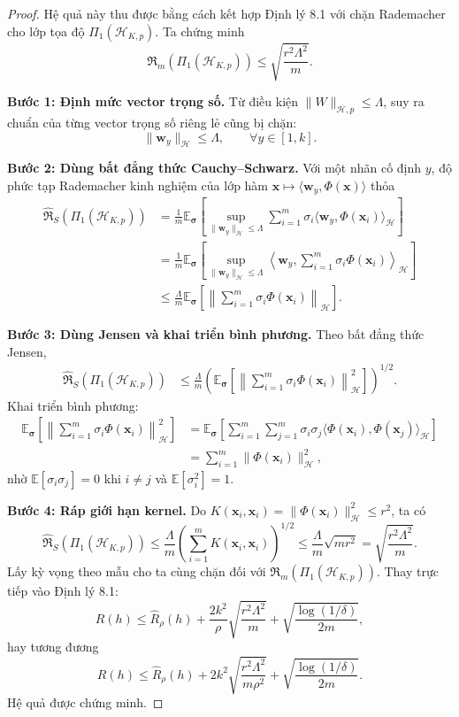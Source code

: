 \begin{proof}
Hệ quả này thu được bằng cách kết hợp Định lý 8.1 với chặn Rademacher cho lớp tọa độ $\Pi_1(\mathcal{H}_{K,p})$. Ta chứng minh
\[
  \mathfrak{R}_m(\Pi_1(\mathcal{H}_{K,p}))
  \leq \sqrt{\frac{r^2\Lambda^2}{m}}.
\]

\textbf{Bước 1: Định mức vector trọng số.}
Từ điều kiện $\|W\|_{\mathcal{H},p}\leq\Lambda$, suy ra chuẩn của từng vector trọng số riêng lẻ cũng bị chặn:
\[
  \|\bm{w}_y\|_{\mathcal{H}}\leq \Lambda,
  \qquad \forall y\in[1,k].
\]

\textbf{Bước 2: Dùng bất đẳng thức Cauchy--Schwarz.}
Với một nhãn cố định $y$, độ phức tạp Rademacher kinh nghiệm của lớp hàm $\bm{x}\mapsto\langle\bm{w}_y,\Phi(\bm{x})\rangle$ thỏa
\begin{align*}
  \widehat{\mathfrak{R}}_S(\Pi_1(\mathcal{H}_{K,p}))
  &=\frac{1}{m}\mathbb{E}_{\bm{\sigma}}
  \left[\sup_{\|\bm{w}_y\|_{\mathcal{H}}\leq\Lambda}
  \sum_{i=1}^{m}\sigma_i\langle\bm{w}_y,\Phi(\bm{x}_i)\rangle_{\mathcal{H}}\right]\\
  &=\frac{1}{m}\mathbb{E}_{\bm{\sigma}}
  \left[\sup_{\|\bm{w}_y\|_{\mathcal{H}}\leq\Lambda}
  \left\langle\bm{w}_y,\sum_{i=1}^{m}\sigma_i\Phi(\bm{x}_i)\right\rangle_{\mathcal{H}}\right]\\
  &\leq \frac{\Lambda}{m}\mathbb{E}_{\bm{\sigma}}
  \left[\left\|\sum_{i=1}^{m}\sigma_i\Phi(\bm{x}_i)\right\|_{\mathcal{H}}\right].
\end{align*}

\textbf{Bước 3: Dùng Jensen và khai triển bình phương.}
Theo bất đẳng thức Jensen,
\begin{align*}
  \widehat{\mathfrak{R}}_S(\Pi_1(\mathcal{H}_{K,p}))
  &\leq \frac{\Lambda}{m}
  \left(\mathbb{E}_{\bm{\sigma}}
  \left[\left\|\sum_{i=1}^{m}\sigma_i\Phi(\bm{x}_i)\right\|_{\mathcal{H}}^2\right]\right)^{1/2}.
\end{align*}
Khai triển bình phương:
\begin{align*}
  \mathbb{E}_{\bm{\sigma}}
  \left[\left\|\sum_{i=1}^{m}\sigma_i\Phi(\bm{x}_i)\right\|_{\mathcal{H}}^2\right]
  &=\mathbb{E}_{\bm{\sigma}}
  \left[\sum_{i=1}^{m}\sum_{j=1}^{m}\sigma_i\sigma_j
  \langle\Phi(\bm{x}_i),\Phi(\bm{x}_j)\rangle_{\mathcal{H}}\right]\\
  &=\sum_{i=1}^{m}\|\Phi(\bm{x}_i)\|_{\mathcal{H}}^2,
\end{align*}
nhờ $\mathbb{E}[\sigma_i\sigma_j]=0$ khi $i\neq j$ và $\mathbb{E}[\sigma_i^2]=1$.

\textbf{Bước 4: Ráp giới hạn kernel.}
Do $K(\bm{x}_i,\bm{x}_i)=\|\Phi(\bm{x}_i)\|_{\mathcal{H}}^2\leq r^2$, ta có
\[
  \widehat{\mathfrak{R}}_S(\Pi_1(\mathcal{H}_{K,p}))
  \leq \frac{\Lambda}{m}\left(\sum_{i=1}^{m}K(\bm{x}_i,\bm{x}_i)\right)^{1/2}
  \leq \frac{\Lambda}{m}\sqrt{mr^2}
  =\sqrt{\frac{r^2\Lambda^2}{m}}.
\]
Lấy kỳ vọng theo mẫu cho ta cùng chặn đối với $\mathfrak{R}_m(\Pi_1(\mathcal{H}_{K,p}))$. Thay trực tiếp vào Định lý 8.1:
\[
  R(h)\leq \widehat{R}_\rho(h)
  +\frac{2k^2}{\rho}\sqrt{\frac{r^2\Lambda^2}{m}}
  +\sqrt{\frac{\log(1/\delta)}{2m}},
\]
hay tương đương
\[
  R(h)\leq \widehat{R}_\rho(h)
  +2k^2\sqrt{\frac{r^2\Lambda^2}{m\rho^2}}
  +\sqrt{\frac{\log(1/\delta)}{2m}}.
\]
Hệ quả được chứng minh.
\end{proof}



